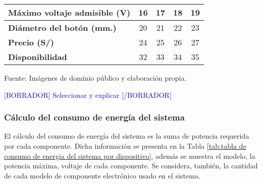 \begin{mytable}[H]
\begin{tabular}{l|c|c|c|c|}
	\multicolumn{1}{|l|}{
		\begin{minipage}{\myforthmaxsizeofcontenttable}			
			\textbf{Máximo voltaje admisible (V)}
		\end{minipage}
	} &
	16
	& 17         & 18         & 19         \\ \hline
	\multicolumn{1}{|l|}{
			\begin{minipage}{\myforthmaxsizeofcontenttable}			
				\textbf{Diámetro del botón (mm.)}
			\end{minipage}
	} & 20                                                                    & 21         & 22         & 23         \\ \hline
	\multicolumn{1}{|l|}{\textbf{Precio (S/)}}              & 24                                                                    & 25         & 26         & 27         \\ \hline
	\multicolumn{1}{|l|}{\textbf{Disponibilidad}}           & 32                                                                    & 33         & 34         & 35         \\ \hline
	\end{tabular}
	\begin{flushleft}	
		Fuente: Imágenes de dominio público y elaboración propia.
	\end{flushleft}
\end{mytable}

\textcolor{blue}{[BORRADOR] Seleccionar y explicar [/BORRADOR]}

\subsubsection{Cálculo del consumo de energía del sistema} 

El cálculo del consumo de energía del sistema es la suma de potencia requerida por cada componente. Dicha información se presenta en la Tabla \ref{tab:tabla de consumo de energia del sistema por dispositivo}, además se muestra el modelo, la potencia máxima, voltaje de cada componente. Se considera, también, la cantidad de cada modelo de componente electrónico usado en el sistema.


